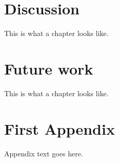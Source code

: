 \documentclass[a4paper,11pt]{kth-mag}
\begin{document}
\chapter{Discussion}
This is what a chapter looks like.

\chapter{Future work}
This is what a chapter looks like.





\appendix
\addappheadtotoc
\chapter{First Appendix}

Appendix text goes here.
\glsaddall
\end{document}
